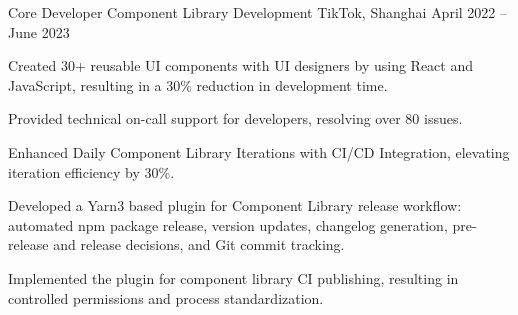 

\begin{cventries}



\cventry
    {Core Developer} %
    {Component Library Development} %
    {TikTok, Shanghai} %
    {April 2022 – June 2023} %
    {
      \begin{cvitems} %
        \item Created 30+ reusable UI components with UI designers by using React and JavaScript, resulting in a 30\% reduction in development time.
        \item Provided technical on-call support for developers, resolving over 80 issues.
        \item Enhanced Daily Component Library Iterations with CI/CD Integration, elevating iteration efficiency by 30\%.
        \item Developed a Yarn3 based plugin for Component Library release workflow: automated npm package release, version updates, changelog generation, pre-release and release decisions, and Git commit tracking.
        \item Implemented the plugin for component library CI publishing, resulting in controlled permissions and process standardization.
      \end{cvitems}
    }



\end{cventries}

